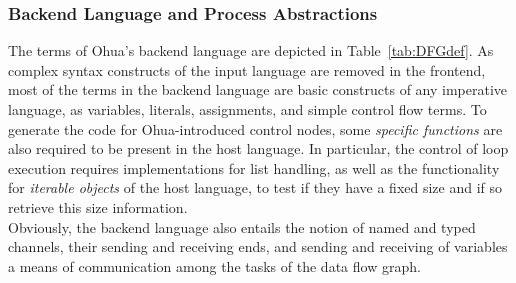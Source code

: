 \subsubsection{Backend Language and Process Abstractions}
\label{subsec:BackendRequirements}
The terms of Ohua's backend language are depicted in Table~\ref{tab:DFGdef}. As complex syntax constructs of the input language are removed in the frontend, most of the terms in the backend language are basic constructs of any imperative language, as variables, literals, assignments, and simple control flow terms. To generate the code for Ohua-introduced control nodes, some \emph{specific functions} are also required to be present in the host language. In particular, the control of loop execution requires implementations for list handling, as well as the functionality for \emph{iterable objects} of the host language, to test if they have a fixed size and if so retrieve this size information. \\

Obviously, the backend language also entails the notion of named and typed channels, their sending and receiving ends, and sending and receiving of variables a means of communication among the tasks of the data flow graph. 

